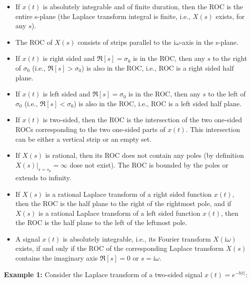 	\begin{itemize}
	
	\item If $x(t)$ is absolutely integrable and of finite duration, then the ROC is
		the entire s-plane (the Laplace transform integral is finite, i.e., $X(s)$ 
		exists, for any $s$).
	
	\item The ROC of $X(s)$ consists of strips parallel to the $\mathrm{i}\omega$-axis in the
		s-plane.
	
	\item If $x(t)$ is right sided and $\Re[s]=\sigma_0$ is in the ROC, then any $s$ to 
		the right of $\sigma_0$ (i.e., $\Re[s]>\sigma_0$) is also in the ROC, i.e.,
		ROC is a right sided half plane.
	
	\item If $x(t)$ is left sided and $\Re[s]=\sigma_0$ is in the ROC, then any $s$ to 
		the left of $\sigma_0$ (i.e., $\Re[s]<\sigma_0$) is also in the ROC, i.e.,
		ROC is a left sided half plane.
	
	\item If $x(t)$ is two-sided, then the ROC is the intersection of the two one-sided
		ROCs corresponding to the two one-sided parts of $x(t)$. This intersection
		can be either a vertical strip or an empty set.
	
	\item If $X(s)$ is rational, then its ROC does not contain any poles (by 
		definition $X(s)|_{s=s_p}=\infty$ dose not exist). The ROC is bounded by 
		the poles or extends to infinity.
	
	\item If $X(s)$ is a rational Laplace transform of a right sided function $x(t)$, 
		then the ROC is the half plane to the right of the rightmost pole, and if 
		$X(s)$ is a rational Laplace transform of a left sided function $x(t)$, 
		then the ROC is the half plane to the left of the leftmost pole.
	
	\item A signal $x(t)$ is absolutely integrable, i.e., its Fourier transform $X(\mathrm{i}\omega)$ 
		exists, if and only if the ROC of the corresponding Laplace transform $X(s)$
		contains the imaginary axis $\Re[s]=0$ or $s=\mathrm{i}\omega$.
	
	\end{itemize}
	
	
	{\bf Example 1: } Consider the Laplace transform of a two-sided signal 
		$x(t)=e^{-b|t|}$:
	

